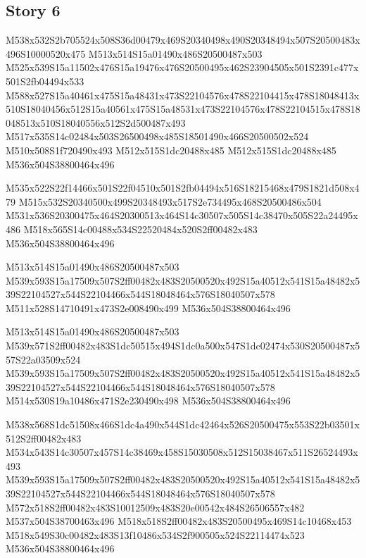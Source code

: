 \documentclass{article}
\begin{document}
\subsection{Story 6}

\begin{multicols}{5}
\begin{center}
M538x532S2b705524x508S36d00479x469S20340498x490S20348494x507S20500483x496S10000520x475 %
M513x514S15a01490x486S20500487x503 %
M525x539S15a11502x476S15a19476x476S20500495x462S23904505x501S2391c477x501S2fb04494x533 %
M588x527S15a40461x475S15a48431x473S22104576x478S22104415x478S18048413x510S18040456x512S15a40561x475S15a48531x473S22104576x478S22104515x478S18048513x510S18040556x512S2d500487x493 %
M517x535S14c02484x503S26500498x485S18501490x466S20500502x524 %
M510x508S1f720490x493 %
M512x515S1dc20488x485 %
M512x515S1dc20488x485 %
M536x504S38800464x496 %

M535x522S22f14466x501S22f04510x501S2fb04494x516S18215468x479S1821d508x479 %
M515x532S20340500x499S20348493x517S2e734495x468S20500486x504 %
M531x536S20300475x464S20300513x464S14c30507x505S14c38470x505S22a24495x486 %
M518x565S14c00488x534S22520484x520S2ff00482x483 %
M536x504S38800464x496 %

M513x514S15a01490x486S20500487x503 %
M539x593S15a17509x507S2ff00482x483S20500520x492S15a40512x541S15a48482x539S22104527x544S22104466x544S18048464x576S18040507x578 %
M511x528S14710491x473S2e008490x499 %
M536x504S38800464x496 %

M513x514S15a01490x486S20500487x503 %
M539x571S2ff00482x483S1dc50515x494S1dc0a500x547S1dc02474x530S20500487x557S22a03509x524 %
M539x593S15a17509x507S2ff00482x483S20500520x492S15a40512x541S15a48482x539S22104527x544S22104466x544S18048464x576S18040507x578 %
M514x530S19a10486x471S2e230490x498 %
M536x504S38800464x496 %

M538x568S1dc51508x466S1dc4a490x544S1dc42464x526S20500475x553S22b03501x512S2ff00482x483 %
M534x543S14c30507x457S14c38469x458S15030508x512S15038467x511S26524493x493 %
M539x593S15a17509x507S2ff00482x483S20500520x492S15a40512x541S15a48482x539S22104527x544S22104466x544S18048464x576S18040507x578 %
M572x518S2ff00482x483S10012509x483S20e00542x484S26506557x482 %
M537x504S38700463x496 %
M518x518S2ff00482x483S20500495x469S14c10468x453 %
M518x549S30c00482x483S13f10486x534S2f900505x524S22114474x523 %
M536x504S38800464x496 %


\end{center}
\end{multicols}
\end{document}

